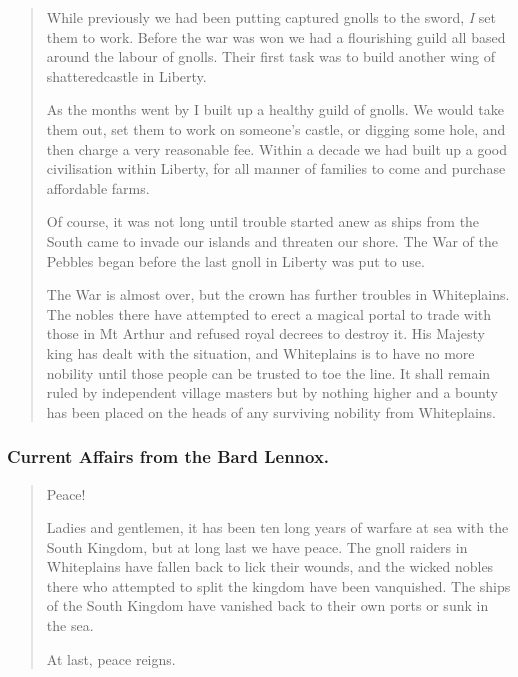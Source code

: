 \begin{multicols}{2}
\begin{quotation}
	While previously we had been putting captured gnolls to the sword, \emph{I} set them to work.
	Before the war was won we had a flourishing guild all based around the labour of gnolls.
	Their first task was to build another wing of \gls{shatteredcastle} in Liberty.

	As the months went by I built up a healthy guild of gnolls.
	We would take them out, set them to work on someone's castle, or digging some hole, and then charge a very reasonable fee.
	Within a decade we had built up a good civilisation within Liberty, for all manner of families to come and purchase affordable farms.

	Of course, it was not long until trouble started anew as ships from the South came to invade our islands and threaten our shore.
	The War of the Pebbles began before the last gnoll in Liberty was put to use.

	The War is almost over, but the crown has further troubles in Whiteplains.
	The nobles there have attempted to erect a magical portal to trade with those in Mt Arthur and refused royal decrees to destroy it.
	His Majesty \gls{king} has dealt with the situation, and Whiteplains is to have no more nobility until those people can be trusted to toe the line.
	It shall remain ruled by independent village masters but by nothing higher and a bounty has been placed on the heads of any surviving nobility from Whiteplains.

\end{quotation}

\subsubsection{Current Affairs from the Bard Lennox.}

\begin{quotation}

	Peace!

	Ladies and gentlemen, it has been ten long years of warfare at sea with the South Kingdom, but at long last we have peace.
	The gnoll raiders in Whiteplains have fallen back to lick their wounds, and the wicked nobles there who attempted to split the kingdom have been vanquished.
	The ships of the South Kingdom have vanished back to their own ports or sunk in the sea.

	At last, peace reigns.

\end{quotation}

\end{multicols}

